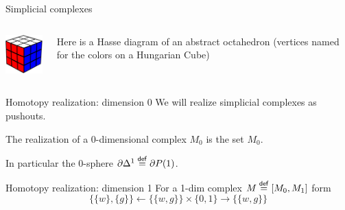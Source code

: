 \documentclass[14pt,aspectratio=169]{beamer}
\begin{document}
\begin{frame}{Simplicial complexes}
\begin{columns}
\begin{column}{0.5\textwidth}
\!\!\!\!\!\vspace{-0.5cm}\resizebox{220pt}{!}{
\begin{tikzpicture}[scale=0.1]

\end{tikzpicture}%
}
\resizebox{90pt}{!}{%

}
\quad
\includegraphics[width=60pt]{figs/hungarian_cube.pdf}
\end{column}
\begin{column}{0.5\textwidth}
Here is a \alert{Hasse diagram} of an abstract octahedron (vertices named for the colors on a Hungarian Cube)
\end{column}
\end{columns}
\end{frame}

\begin{frame}{Homotopy realization: dimension 0}
We will \alert{realize} simplicial complexes as pushouts.

The realization of a 0-dimensional complex \( M_0 \) is the set \( M_0 \).

In particular the 0-sphere \( \partial\Delta^1\stackrel{\mathsf{def}}{=} \partial P(1) \).
\end{frame}

\begin{frame}{Homotopy realization: dimension 1}
For a 1-dim complex \( M\stackrel{\mathsf{def}}{=} [M_0,M_1] \) form
\[
\]
\[\{\{w\}, \{g\}\}\leftarrow \{\{w, g\}\}\times\{0, 1\}\to \{\{w, g\}\}\]
\end{frame}
\end{document}
